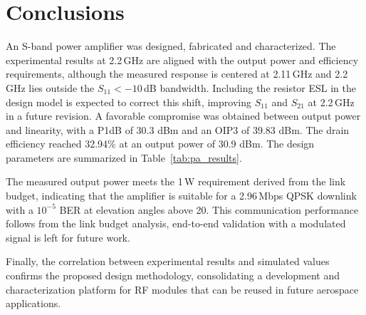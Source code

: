 \section{Conclusions}
An S-band power amplifier was designed, fabricated and characterized. The experimental results at 2.2\,GHz are aligned with the output power and efficiency requirements, although the measured response is centered at 2.11\,GHz and 2.2\,GHz lies outside the $S_{11}<-10$\,dB bandwidth. Including the resistor ESL in the design model is expected to correct this shift, improving $S_{11}$ and $S_{21}$ at 2.2\,GHz in a future revision. A favorable compromise was obtained between output power and linearity, with a P1dB of 30.3 dBm and an OIP3 of 39.83 dBm. The drain efficiency reached 32.94\% at an output power of 30.9 dBm. The design parameters are summarized in Table~\ref{tab:pa_results}.

The measured output power meets the 1\,W requirement derived from the link budget, indicating that the amplifier is suitable for a 2.96\,Mbps QPSK downlink with a $10^{-5}$ BER at elevation angles above 20\degree. This communication performance follows from the link budget analysis, end-to-end validation with a modulated signal is left for future work.

Finally, the correlation between experimental results and simulated values confirms the proposed design methodology, consolidating a development and characterization platform for RF modules that can be reused in future aerospace applications.